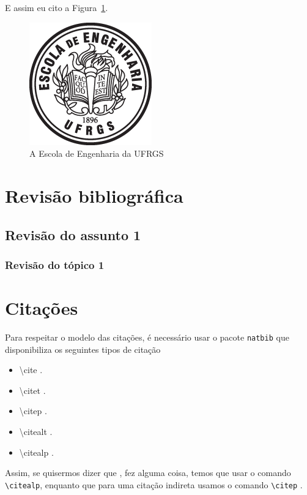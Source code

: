 \documentclass{automatex}
\begin{document}
\lipsum[13]

E assim eu cito a Figura~\ref{fig:ee}.

\begin{figure}
  \centering
  \includegraphics[width=.3\textwidth]{imagens/logo_eng}
  \caption{A Escola de Engenharia da UFRGS}
  \label{fig:ee}
\end{figure}


\section{Revisão bibliográfica}

\lipsum[10]

\subsection{Revisão do assunto 1}

\lipsum[11]

\subsubsection{Revisão do tópico 1}

\lipsum[12]

\section{Citações}

Para respeitar o modelo das citações, é necessário usar o pacote {\tt natbib} que disponibiliza
os seguintes tipos de citação
\begin{itemize}
  \item \textbackslash{cite} \cite{small}.
  \item \textbackslash{citet} \citet{small}.
  \item \textbackslash{citep} \citep{small}.
  \item \textbackslash{citealt} \citealt{small}.
  \item \textbackslash{citealp} \citealp{small}.
\end{itemize}

Assim, se quisermos dizer que \citealp{big}, fez alguma coisa, temos que usar o comando {\tt \textbackslash{citealp}},
enquanto que para uma citação indireta usamos o comando {\tt \textbackslash{citep}} \citep{big}.


\end{document}

